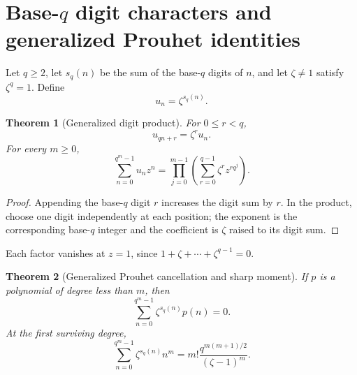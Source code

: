 \documentclass[11pt,oneside]{article}
\numberwithin{equation}{section}
\newtheorem{theorem}{Theorem}[section]
\theoremstyle{definition}
\theoremstyle{remark}
\begin{document}
\section[Base-\texorpdfstring{\(q\)}{q} generalization]{Base-\texorpdfstring{\(q\)}{q} digit characters and generalized Prouhet identities}
\label{sec:base-q}

Let \(q\ge2\), let \(s_q(n)\) be the sum of the base-\(q\) digits of \(n\),
and let \(\zeta\ne1\) satisfy \(\zeta^q=1\).  Define
\begin{equation}
  u_n=\zeta^{s_q(n)}.
  \label{eq:generalized-digit-character}
\end{equation}

\begin{theorem}[Generalized digit product]
\label{thm:base-q-product}
For \(0\le r<q\),
\begin{equation}
  u_{qn+r}=\zeta^ru_n.
  \label{eq:base-q-recursion}
\end{equation}
For every \(m\ge0\),
\begin{equation}
  \boxed{
  \sum_{n=0}^{q^m-1}u_nz^n
  =\prod_{j=0}^{m-1}
  \left(\sum_{r=0}^{q-1}\zeta^rz^{rq^j}\right).}
  \label{eq:base-q-product}
\end{equation}
\end{theorem}

\begin{proof}
Appending the base-\(q\) digit \(r\) increases the digit sum by \(r\).  In the
product, choose one digit independently at each position; the exponent is the
corresponding base-\(q\) integer and the coefficient is \(\zeta\) raised to
its digit sum.
\end{proof}

Each factor vanishes at \(z=1\), since
\(1+\zeta+\cdots+\zeta^{q-1}=0\).

\begin{theorem}[Generalized Prouhet cancellation and sharp moment]
\label{thm:base-q-Prouhet}
If \(p\) is a polynomial of degree less than \(m\), then
\begin{equation}
  \boxed{
  \sum_{n=0}^{q^m-1}\zeta^{s_q(n)}p(n)=0.}
  \label{eq:base-q-Prouhet}
\end{equation}
At the first surviving degree,
\begin{equation}
  \boxed{
  \sum_{n=0}^{q^m-1}\zeta^{s_q(n)}n^m
  =m!\frac{q^{m(m+1)/2}}{(\zeta-1)^m}.}
  \label{eq:base-q-sharp-moment}
\end{equation}
\end{theorem}
\end{document}
